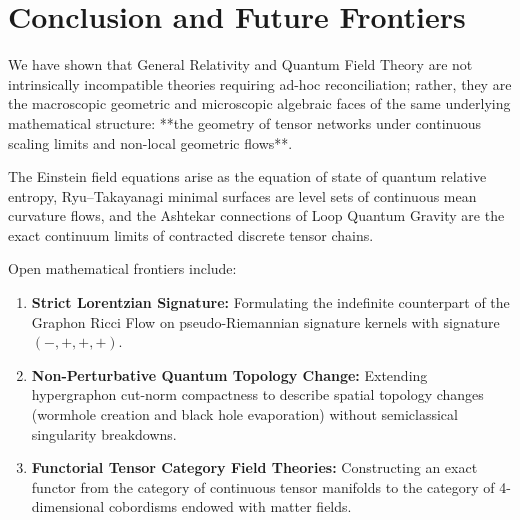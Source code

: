 \documentclass[11pt,a4paper,reqno]{amsart}
\theoremstyle{definition}
\numberwithin{equation}{section}
\begin{document}
\section{Conclusion and Future Frontiers}
\label{sec:conclusion}

We have shown that General Relativity and Quantum Field Theory are not intrinsically incompatible theories requiring ad-hoc reconciliation; rather, they are the macroscopic geometric and microscopic algebraic faces of the same underlying mathematical structure: **the geometry of tensor networks under continuous scaling limits and non-local geometric flows**.

The Einstein field equations arise as the equation of state of quantum relative entropy, Ryu--Takayanagi minimal surfaces are level sets of continuous mean curvature flows, and the Ashtekar connections of Loop Quantum Gravity are the exact continuum limits of contracted discrete tensor chains.

Open mathematical frontiers include:
\begin{enumerate}
    \item \textbf{Strict Lorentzian Signature:} Formulating the indefinite counterpart of the Graphon Ricci Flow on pseudo-Riemannian signature kernels with signature $(-, +, +, +)$.
    \item \textbf{Non-Perturbative Quantum Topology Change:} Extending hypergraphon cut-norm compactness to describe spatial topology changes (wormhole creation and black hole evaporation) without semiclassical singularity breakdowns.
    \item \textbf{Functorial Tensor Category Field Theories:} Constructing an exact functor from the category of continuous tensor manifolds to the category of 4-dimensional cobordisms endowed with matter fields.
\end{enumerate}
\end{document}
